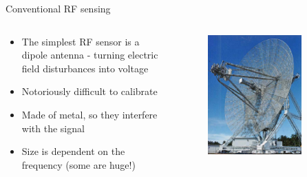 \begin{frame}{Conventional RF sensing}
    \begin{columns}
        \begin{column}{0.5\textwidth}
            \begin{itemize}
                \item The simplest RF sensor is a dipole antenna - turning electric field disturbances into voltage
                \item Notoriously difficult to calibrate
                \item Made of metal, so they interfere with the signal
                \item Size is dependent on the frequency (some are huge!)
            \end{itemize}
        \end{column}
        \begin{column}{0.5\textwidth}
            \begin{figure}
                \centering
                \includegraphics[width=0.8\textwidth]{images/radar_antenna_huge.jpg}
            \end{figure}
        \end{column}
    \end{columns}
\end{frame}

